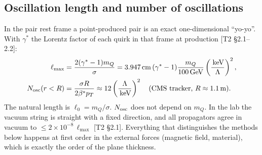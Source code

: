 \documentclass[11pt,a4paper]{article}
\newcommand{\mQ}{m_Q}
\newcommand{\GeV}{\ensuremath{\,\mathrm{GeV}}}
\newcommand{\keV}{\ensuremath{\,\mathrm{keV}}}
\newcommand{\gst}{\gamma^*}
\newcommand{\lmax}{\ell_{\max}}
\newcommand{\src}[1]{{\color{mid}[#1]}}
\begin{document}
\subsection{Oscillation length and number of oscillations}
In the pair rest frame a point-produced pair is an exact one-dimensional ``yo-yo''. With $\gst$ the Lorentz factor of each quirk in that frame at production \src{T2 \S2.1--2.2}:
\begin{align}
\lmax&=\frac{2(\gst-1)\mQ}{\sigma}=3.947\,{\rm cm}\,(\gst-1)\frac{\mQ}{100\GeV}\left(\frac{\keV}{\Lambda}\right)^2,\\
N_{\rm osc}(r<R)&=\frac{\sigma R}{2\beta^*p_T}\approx12\left(\frac{\Lambda}{\keV}\right)^2\quad\text{(CMS tracker, $R\approx1.1$\,m)} .
\end{align}
The natural length is $\ell_0=\mQ/\sigma$. $N_{\rm osc}$ does not depend on $\mQ$. In the lab the vacuum string is straight with a fixed direction, and all propagators agree in vacuum to $\le2\times10^{-8}\,\lmax$ \src{T2 \S2.1}. Everything that distinguishes the methods below happens at first order in the external forces (magnetic field, material), which is exactly the order of the plane thickness.
\end{document}
